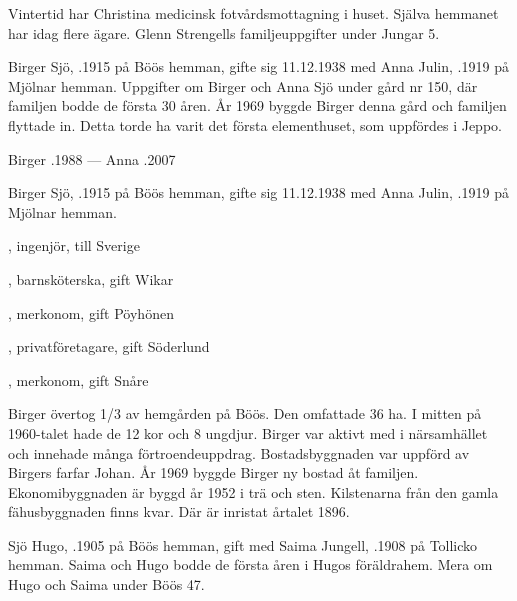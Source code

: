 Vintertid har Christina medicinsk fotvårdsmottagning i huset. Själva hemmanet har idag flere ägare. Glenn Strengells familjeuppgifter under Jungar 5.


%
Birger Sjö, .1915 på Böös hemman, gifte sig 11.12.1938 med Anna Julin, .1919 på Mjölnar hemman. Uppgifter om Birger och Anna Sjö under gård nr 150, där familjen bodde de första 30 åren. År 1969 byggde Birger denna gård och familjen flyttade in. Detta torde ha varit det första elementhuset, som uppfördes i Jeppo.

Birger .1988  ---  Anna .2007


%



%
Birger Sjö, .1915 på Böös hemman, gifte sig 11.12.1938 med Anna Julin, .1919 på Mjölnar hemman.
\begin{jhchildren}
  \item {}, ingenjör, till Sverige
  \item {}, barnsköterska, gift Wikar
  \item {}, merkonom, gift Pöyhönen
  \item {}, privatföretagare, gift Söderlund
  \item {}, merkonom, gift Snåre
\end{jhchildren}

Birger övertog 1/3 av hemgården på Böös. Den omfattade 36 ha. I mitten på 1960-talet hade de 12 kor och 8 ungdjur. Birger var aktivt med i närsamhället och innehade många förtroendeuppdrag. Bostadsbyggnaden var uppförd av Birgers farfar Johan. År 1969 byggde Birger ny bostad åt familjen. Ekonomibyggnaden är byggd år 1952 i trä och sten. Kilstenarna från den gamla fähusbyggnaden finns kvar. Där är inristat årtalet 1896.



%
Sjö Hugo, .1905 på Böös hemman, gift med Saima Jungell, .1908 på Tollicko hemman. Saima och Hugo bodde de första åren i Hugos föräldrahem. Mera om Hugo och Saima under Böös 47.


